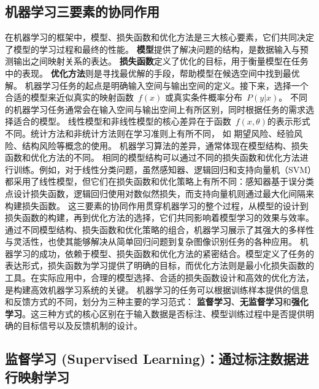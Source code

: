  \subsection{机器学习三要素的协同作用}
在机器学习的框架中，模型、损失函数和优化方法是三大核心要素，它们共同决定了模型的学习过程和最终的性能。
{\bf 模型}提供了解决问题的结构，是数据输入与预测输出之间映射关系的表达。
{\bf 损失函数}定义了优化的目标，用于衡量模型在任务中的表现。
{\bf 优化方法}则是寻找最优解的手段，帮助模型在候选空间中找到最优解。
机器学习任务的起点是明确输入空间与输出空间的定义。接下来，选择一个合适的模型来近似真实的映射函数~$f(x)$ 或真实条件概率分布~$P(y|x)$。
不同的机器学习任务通常会在输入空间与输出空间上有所区别，同时根据任务的需求选择适合的模型。
线性模型和非线性模型的核心差异在于函数~$ f(x, \theta)$的表示形式不同。统计方法和非统计方法则在学习准则上有所不同， 如	期望风险、经验风险、结构风险等概念的使用。
机器学习算法的差异，通常体现在模型结构、损失函数和优化方法的不同。
相同的模型结构可以通过不同的损失函数和优化方法进行训练。例如，对于线性分类问题，虽然感知器、逻辑回归和支持向量机（SVM）都采用了线性模型，但它们在损失函数和优化策略上有所不同：感知器基于误分类点设计损失函数，逻辑回归使用对数似然损失，而支持向量机则通过最大化间隔来构建损失函数。
这三要素的协同作用贯穿机器学习的整个过程，从模型的设计到损失函数的构建，再到优化方法的选择，它们共同影响着模型学习的效果与效率。
通过不同模型结构、损失函数和优化策略的组合，机器学习展示了其强大的多样性与灵活性，也使其能够解决从简单回归问题到复杂图像识别任务的各种应用。
机器学习的成功，依赖于模型、损失函数和优化方法的紧密结合。模型定义了任务的表达形式，损失函数为学习提供了明确的目标，而优化方法则是最小化损失函数的工具。在实际应用中，合理的模型选择、合适的损失函数设计和高效的优化方法，是构建高效机器学习系统的关键。
机器学习的任务可以根据训练样本提供的信息和反馈方式的不同，划分为三种主要的学习范式：
{\bf 监督学习}、{\bf 无监督学习}和{\bf 强化学习}。这三种方式的核心区别在于输入数据是否标注、模型训练过程中是否提供明确的目标信号以及反馈机制的设计。

\subsection{ 监督学习 (Supervised Learning)：通过标注数据进行映射学习}

